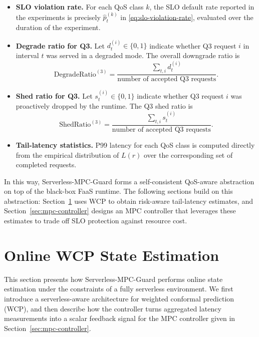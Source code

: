 \documentclass[journal]{IEEEtran}
\begin{document}
\begin{itemize}
  \item \textbf{SLO violation rate.}
        For each QoS class $k$, the SLO default rate reported in the
        experiments is precisely $\hat{p}_t^{(k)}$ in
        \eqref{eq:slo-violation-rate}, evaluated over the duration of
        the experiment.
  \item \textbf{Degrade ratio for Q3.}
        Let $d_t^{(i)} \in \{0,1\}$ indicate whether Q3 request $i$
        in interval $t$ was served in a degraded mode. The overall
        downgrade ratio is
        \begin{equation}
          \text{DegradeRatio}^{(3)}
          =
          \frac{\sum_{t,i} d_t^{(i)}}
               {\text{number of accepted Q3 requests}}.
          \label{eq:q3-degrade-ratio}
        \end{equation}
  \item \textbf{Shed ratio for Q3.}
        Let $s_t^{(i)} \in \{0,1\}$ indicate whether Q3 request $i$
        was proactively dropped by the runtime. The Q3 shed ratio is
        \begin{equation}
          \text{ShedRatio}^{(3)}
          =
          \frac{\sum_{t,i} s_t^{(i)}}
               {\text{number of accepted Q3 requests}}.
          \label{eq:q3-shed-ratio}
        \end{equation}
  \item \textbf{Tail-latency statistics.}
        P99 latency for each QoS class is computed directly from the
        empirical distribution of $L(r)$ over the corresponding set
        of completed requests.
\end{itemize}

In this way, Serverless-MPC-Guard forms a self-consistent QoS-aware abstraction on top of the black-box FaaS runtime. The following sections build on this abstraction: Section~\ref{sec:wcp-estimation} uses WCP to obtain risk-aware tail-latency estimates, and Section~\ref{sec:mpc-controller} designs an MPC controller that leverages these estimates to trade off SLO protection against resource cost.

\section{Online WCP State Estimation}
\label{sec:wcp-estimation}

This section presents how Serverless-MPC-Guard performs online
state estimation under the constraints of a fully serverless
environment. We first introduce a serverless-aware architecture for
weighted conformal prediction (WCP), and then describe how the
controller turns aggregated latency measurements into a scalar
feedback signal for the MPC controller given in
Section~\ref{sec:mpc-controller}.
\end{document}
